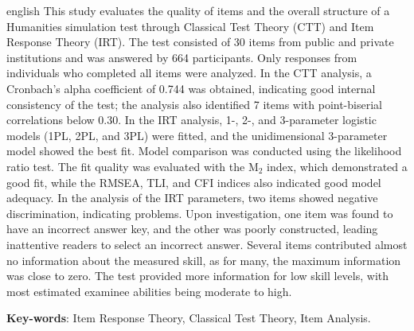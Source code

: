 \begin{resumo}[Abstract]
 \begin{otherlanguage*}{english}
   This study evaluates the quality of items and the overall structure of a Humanities simulation test through Classical Test Theory (CTT) and Item Response Theory (IRT). The test consisted of 30 items from public and private institutions and was answered by 664 participants. Only responses from individuals who completed all items were analyzed. In the CTT analysis, a Cronbach's alpha coefficient of 0.744 was obtained, indicating good internal consistency of the test; the analysis also identified 7 items with point-biserial correlations below 0.30. In the IRT analysis, 1-, 2-, and 3-parameter logistic models (1PL, 2PL, and 3PL) were fitted, and the unidimensional 3-parameter model showed the best fit. Model comparison was conducted using the likelihood ratio test. The fit quality was evaluated with the M$_2$ index, which demonstrated a good fit, while the RMSEA, TLI, and CFI indices also indicated good model adequacy. In the analysis of the IRT parameters, two items showed negative discrimination, indicating problems. Upon investigation, one item was found to have an incorrect answer key, and the other was poorly constructed, leading inattentive readers to select an incorrect answer. Several items contributed almost no information about the measured skill, as for many, the maximum information was close to zero. The test provided more information for low skill levels, with most estimated examinee abilities being moderate to high.

   \vspace{\onelineskip}

   \noindent
   \textbf{Key-words}: Item Response Theory, Classical Test Theory, Item Analysis.
 \end{otherlanguage*}
\end{resumo}